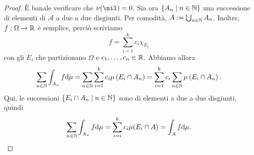 \begin{proof}
È banale verificare che \(\nu(\nil) = 0\). Sia ora \(\left\{A_n \mid n \in \mathbb N\right\}\) una successione di elementi di \(\mathcal A\) a due a due disgiunti. Per comodità, \(A := \bigcup_{n \in \mathbb N} A_n\). Inoltre, \(f : \Omega \to \mathbb R\) è semplice, perciò scriviamo
\[f = \sum_{i=1}^k c_i \chi_{E_i}\]
con gli \(E_i\) che partizionano \(\Omega\) e \(c_1, \dots{}, c_n \in \mathbb R\). Abbiamo allora
\[\sum_{n \in \mathbb N} \int_{A_n} f \mathrm d \mu = \sum_{n \in \mathbb N} \sum_{i = 1}^k c_i \mu \left(E_i \cap A_n \right) = \sum_{i = 1}^k c_i  \sum_{n \in \mathbb N} \mu \left(E_i \cap A_n \right) .\]
Qui, le successioni \(\left\{E_i \cap A_n \mid n \in \mathbb N\right\}\) sono di elementi a due a due disgiunti, quindi
\[\sum_{n \in \mathbb N} \int_{A_n} f \mathrm d \mu = \sum_{i = i}^k c_i \mu(E_i \cap A) = \int_{A} f \mathrm d \mu . \qedhere\]
\end{proof}


